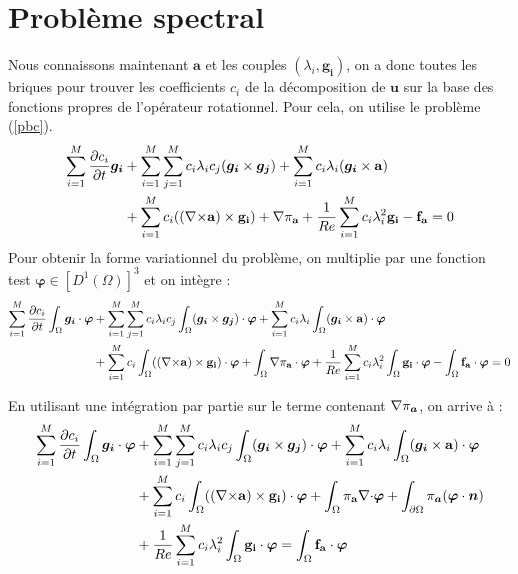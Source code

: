 \section{Problème spectral}
\label{spectre}
Nous connaissons maintenant $\bm{a}$ et les couples $(\lambda_i,\bm{g_i})$, on a donc toutes les briques pour trouver les coefficients $c_i$ de la décomposition de $\bm{u}$ sur la base des fonctions propres de l'opérateur rotationnel. Pour cela, on utilise le problème (\ref{pbc}).
\begin{align*}
\sum_{i=1}^M\frac{\partial c_i}{\partial t}\bm{g_i} &+ \sum_{i=1}^M\sum_{j=1}^Mc_i\lambda_ic_j(\bm{g_i}\times \bm{g_j}) + \sum_{i=1}^Mc_i\lambda_i(\bm{g_i}\times \mathbf{a})\\
& +  \sum_{i=1}^Mc_i(({\nabla\times}\mathbf{a})\times \mathbf{g_i}) + {\nabla} \pi_{\mathbf{a}} +\frac{1}{Re}\sum_{i=1}^Mc_i\lambda_i^2\mathbf{g_i} - \mathbf{f_a} = 0\\
\end{align*}
Pour obtenir la forme variationnel du problème, on multiplie par une fonction test $\bm{\varphi}\in [D^1(\Omega)]^3$ et on intègre :
\begin{align*}
\sum_{i=1}^M\frac{\partial c_i}{\partial t}\int_\Omega\bm{g_i}\cdot\bm{\varphi} &+ \sum_{i=1}^M\sum_{j=1}^Mc_i\lambda_ic_j\int_\Omega(\bm{g_i}\times \bm{g_j})\cdot\bm{\varphi} + \sum_{i=1}^Mc_i\lambda_i\int_\Omega(\bm{g_i}\times \mathbf{a})\cdot\bm{\varphi}\\
& +  \sum_{i=1}^Mc_i\int_\Omega(({\nabla\times}\mathbf{a})\times \mathbf{g_i})\cdot\bm{\varphi} + \int_\Omega{\nabla} \pi_{\mathbf{a}}\cdot\bm{\varphi} +\frac{1}{Re}\sum_{i=1}^Mc_i\lambda_i^2\int_\Omega\mathbf{g_i}\cdot\bm{\varphi} - \int_\Omega\mathbf{f_a}\cdot\bm{\varphi} = 0\\
\end{align*}

En utilisant une intégration par partie sur le terme contenant ${\nabla}\pi_{\bm{a}}$, on arrive à :
\begin{align*}
\sum_{i=1}^M\frac{\partial c_i}{\partial t}\int_\Omega\bm{g_i}\cdot\bm{\varphi} &+ \sum_{i=1}^M\sum_{j=1}^Mc_i\lambda_ic_j\int_\Omega(\bm{g_i}\times \bm{g_j})\cdot\bm{\varphi} + \sum_{i=1}^Mc_i\lambda_i\int_\Omega(\bm{g_i}\times \mathbf{a})\cdot\bm{\varphi}\\
& +  \sum_{i=1}^Mc_i\int_\Omega(({\nabla\times}\mathbf{a})\times \mathbf{g_i})\cdot\bm{\varphi} + \int_\Omega\pi_{\mathbf{a}}{\nabla\cdot}\bm{\varphi} + \int_{\partial\Omega}\pi_{\bm{a}}(\bm{\varphi}\cdot\bm{n})\\
& +\frac{1}{Re}\sum_{i=1}^Mc_i\lambda_i^2\int_\Omega\mathbf{g_i}\cdot\bm{\varphi} = \int_\Omega\mathbf{f_a}\cdot\bm{\varphi}\\
\end{align*}

